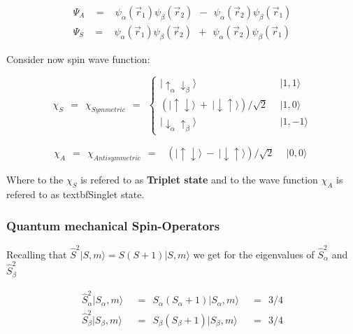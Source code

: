 \documentclass[10pt]{report}
\numberwithin{equation}{chapter}
\begin{document}
\begin{align}
  \Psi_A ~~~~ = ~~~~ \psi_\alpha(\vec{r}_1) \psi_\beta(\vec{r}_2) ~~ - ~~ \psi_\alpha(\vec{r}_2)\psi_\beta(\vec{r}_1)\\
  \Psi_S ~~~~ = ~~~~ \psi_\alpha(\vec{r}_1) \psi_\beta(\vec{r}_2) ~~ + ~~ \psi_\alpha(\vec{r}_2)\psi_\beta(\vec{r}_1)
\end{align}



Consider now spin wave function:

\begin{equation}
  \chi_S ~~ = ~~ \chi_{Symmetric} ~~ = ~~ \left\{ 
  \begin{array}{ll}
    | \uparrow_\alpha \downarrow_\beta \rangle &~~ | 1,1 \rangle\\
    \left( | \uparrow \downarrow \rangle ~+~ | \downarrow \uparrow \rangle \right)/ \sqrt{2} &~~ | 1,0 \rangle\\
    | \downarrow_\alpha \uparrow_\beta \rangle &~~ | 1,-1 \rangle
  \end{array}\right.
\end{equation}

\begin{equation}
  \chi_A ~~ = ~~ \chi_{Antisymmetric} ~~ = ~~ 
  \begin{array}{ll}
    \left(| \uparrow \downarrow \rangle ~-~ | \downarrow \uparrow \rangle \right) / \sqrt{2} &~~ | 0,0 \rangle 
  \end{array}
\end{equation}

Where to the $\chi_S$ is refered to as \textbf{Triplet state} and to the wave function $\chi_A$ is refered to as textbf{Singlet state}.


\subsubsection{Quantum mechanical Spin-Operators}

Recalling that $\hat{S}^2 |S,m \rangle = S(S+1) | S,m \rangle$ we get for the eigenvalues of $\hat{S}^2_\alpha$ and $\hat{S}^2_\beta$

\begin{align}
  \hat{S}^2_\alpha |S_\alpha,m\rangle ~~ & = ~~ S_\alpha (S_\alpha+1) |S_\alpha,m\rangle ~~ & = ~~ 3/4\\
  \hat{S}^2_\beta  |S_\beta,m\rangle ~~ & = ~~ S_\beta  (S_\beta+1)  |S_\beta,m\rangle ~~ & = ~~ 3/4
\end{align}
\end{document}
